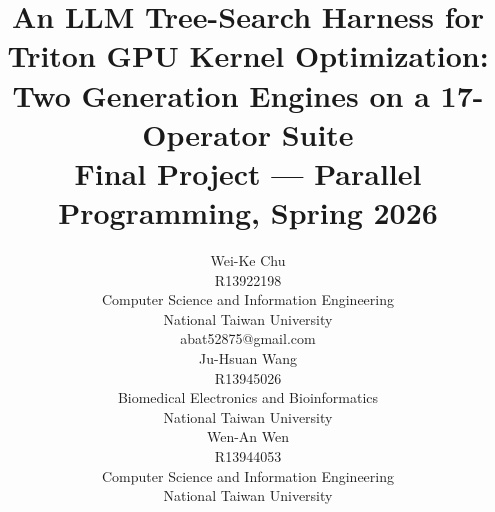 \documentclass[conference]{IEEEtran}
\begin{document}
\title{An LLM Tree-Search Harness for Triton GPU Kernel Optimization:\\
Two Generation Engines on a 17-Operator Suite\\
{\footnotesize Final Project --- Parallel Programming, Spring 2026}}

\author{%
\hfil
\parbox[t]{0.31\textwidth}{\centering Wei-Ke Chu\\ \footnotesize R13922198\\
  Computer Science and Information Engineering\\ National Taiwan University\\
  abat52875@gmail.com}%
\hfil
\parbox[t]{0.31\textwidth}{\centering Ju-Hsuan Wang\\ \footnotesize R13945026\\
  Biomedical Electronics and Bioinformatics\\ National Taiwan University}%
\hfil
\parbox[t]{0.31\textwidth}{\centering Wen-An Wen\\ \footnotesize R13944053\\
  Computer Science and Information Engineering\\ National Taiwan University}%
\hfil
}

\maketitle
\end{document}
